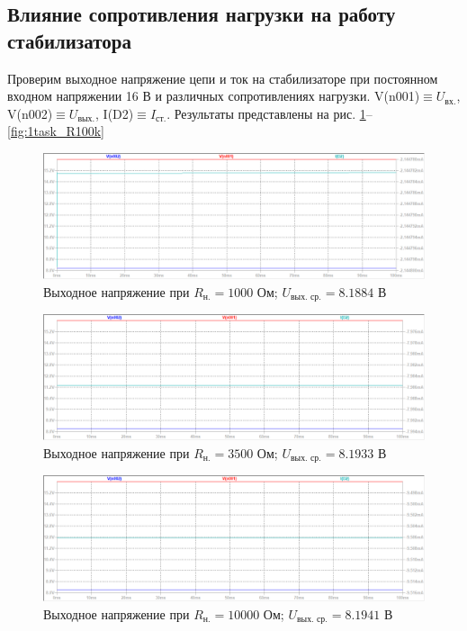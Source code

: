 \documentclass[a4paper, 12pt]{article}
\begin{document}
    \subsection{Влияние сопротивления нагрузки на работу стабилизатора}
    Проверим выходное напряжение цепи и ток на стабилизаторе при постоянном входном напряжении
    16 В и различных сопротивлениях нагрузки. V(n001)$\equiv U_{\text{вх.}}$, V(n002)$\equiv U_{\text{вых.}}$,
    I(D2)$\equiv I_{\text{ст.}}$. Результаты представлены на рис.
    \ref{fig:1task_R1k}--\ref{fig:1task_R100k}
    \begin{figure}[H]
        \centering
        \includegraphics[scale=0.46]{1task_R1k.png}
        \captionsetup{skip=0pt}
        \caption{Выходное напряжение при $R_{\text{н.}}=1000$ Ом; $U_{\text{вых. ср.}}=8.1884$ В}
        \label{fig:1task_R1k}
    \end{figure}
    \begin{figure}[H]
        \centering
        \includegraphics[scale=0.46]{1task_R3_5k.png}
        \captionsetup{skip=0pt}
        \caption{Выходное напряжение при $R_{\text{н.}}=3500$ Ом; $U_{\text{вых. ср.}}=8.1933$ В}
        \label{fig:1task_R3_5k}
    \end{figure}
    \begin{figure}[H]
        \centering
        \includegraphics[scale=0.46]{1task_R10k.png}
        \captionsetup{skip=0pt}
        \caption{Выходное напряжение при $R_{\text{н.}}=10000$ Ом; $U_{\text{вых. ср.}}=8.1941$ В}
        \label{fig:1task_R10k}
    \end{figure}
\end{document}
